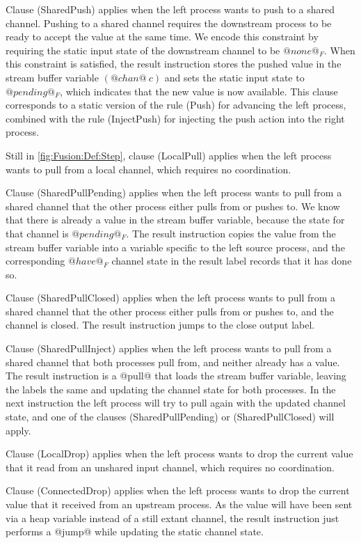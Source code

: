 Clause (SharedPush) applies when the left process wants to push to a shared channel.
Pushing to a shared channel requires the downstream process to be ready to accept the value at the same time.
We encode this constraint by requiring the static input state of the downstream channel to be $@none@_F$.
When this constraint is satisfied, the result instruction stores the pushed value in the stream buffer variable $(@chan@~c)$ and sets the static input state to $@pending@_F$, which indicates that the new value is now available.
This clause corresponds to a static version of the rule (Push) for advancing the left process, combined with the rule (InjectPush) for injecting the push action into the right process.

Still in \autoref{fig:Fusion:Def:Step}, clause (LocalPull) applies when the left process wants to pull from a local channel, which requires no coordination.

Clause (SharedPullPending) applies when the left process wants to pull from a shared channel that the other process either pulls from or pushes to.
We know that there is already a value in the stream buffer variable, because the state for that channel is $@pending@_F$.
The result instruction copies the value from the stream buffer variable into a variable specific to the left source process, and the corresponding $@have@_F$ channel state in the result label records that it has done so.

Clause (SharedPullClosed) applies when the left process wants to pull from a shared channel that the other process either pulls from or pushes to, and the channel is closed.
The result instruction jumps to the close output label.

Clause (SharedPullInject) applies when the left process wants to pull from a shared channel that both processes pull from, and neither already has a value.
The result instruction is a @pull@ that loads the stream buffer variable, leaving the labels the same and updating the channel state for both processes.
In the next instruction the left process will try to pull again with the updated channel state, and one of the clauses (SharedPullPending) or (SharedPullClosed) will apply.

Clause (LocalDrop) applies when the left process wants to drop the current value that it read from an unshared input channel, which requires no coordination.

Clause (ConnectedDrop) applies when the left process wants to drop the current value that it received from an upstream process. As the value will have been sent via a heap variable instead of a still extant channel, the result instruction just performs a @jump@ while updating the static channel state.

